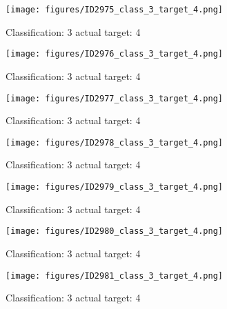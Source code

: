\begin{figure}[h!]
\begin{center}
\texttt{[image: figures/ID2975\_class\_3\_target\_4.png]}
\end{center}
\caption{ Classification: 3 actual target: 4}
\label{fig:ID2975_class_3_target_4}
\end{figure}
\begin{figure}[h!]
\begin{center}
\texttt{[image: figures/ID2976\_class\_3\_target\_4.png]}
\end{center}
\caption{ Classification: 3 actual target: 4}
\label{fig:ID2976_class_3_target_4}
\end{figure}
\begin{figure}[h!]
\begin{center}
\texttt{[image: figures/ID2977\_class\_3\_target\_4.png]}
\end{center}
\caption{ Classification: 3 actual target: 4}
\label{fig:ID2977_class_3_target_4}
\end{figure}
\begin{figure}[h!]
\begin{center}
\texttt{[image: figures/ID2978\_class\_3\_target\_4.png]}
\end{center}
\caption{ Classification: 3 actual target: 4}
\label{fig:ID2978_class_3_target_4}
\end{figure}
\begin{figure}[h!]
\begin{center}
\texttt{[image: figures/ID2979\_class\_3\_target\_4.png]}
\end{center}
\caption{ Classification: 3 actual target: 4}
\label{fig:ID2979_class_3_target_4}
\end{figure}
\begin{figure}[h!]
\begin{center}
\texttt{[image: figures/ID2980\_class\_3\_target\_4.png]}
\end{center}
\caption{ Classification: 3 actual target: 4}
\label{fig:ID2980_class_3_target_4}
\end{figure}
\begin{figure}[h!]
\begin{center}
\texttt{[image: figures/ID2981\_class\_3\_target\_4.png]}
\end{center}
\caption{ Classification: 3 actual target: 4}
\label{fig:ID2981_class_3_target_4}
\end{figure}
